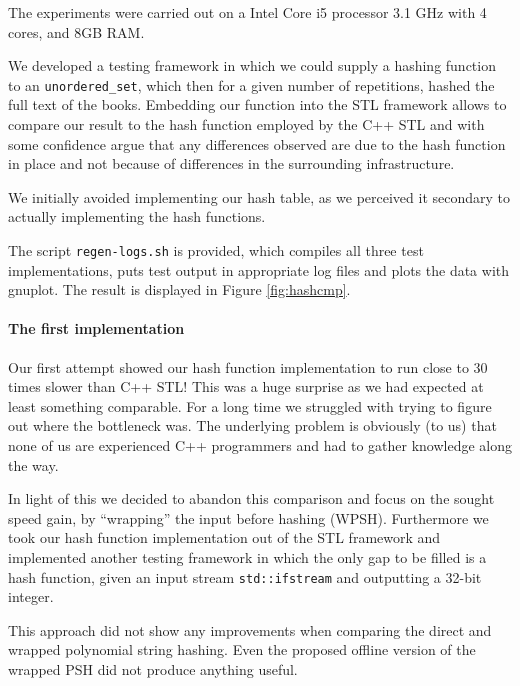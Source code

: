 \documentclass[]{article}
\newcommand{\funk}[1]{\texttt{\small #1}}
\newcommand{\cpp}{C+\!+\xspace}
\begin{document}
The experiments were carried out on a Intel Core i5 processor 3.1 GHz with 4 cores, and 8GB RAM.

We developed a testing framework in which we could supply a hashing function to an \funk{unordered\_set}, which then for a given number of repetitions, hashed the full text of the books. Embedding our function into the STL framework allows to compare our result to the hash function employed by the \cpp STL and with some confidence argue that any differences observed are due to the hash function in place and not because of differences in the surrounding infrastructure. 

We initially avoided implementing our hash table, as we perceived it secondary to actually implementing the hash functions.

The script \funk{regen-logs.sh} is provided, which compiles all three test implementations, puts test output in appropriate log files and plots the data with gnuplot. The result is displayed in Figure \ref{fig:hashcmp}.

\paragraph{The first implementation}

Our first attempt showed our hash function implementation to run close to 30 times slower than \cpp STL! This was a huge surprise as we had expected at least something comparable. For a long time we struggled with trying to figure out where the bottleneck was. The underlying problem is obviously (to us) that none of us are experienced \cpp programmers and had to gather knowledge along the way.

In light of this we decided to abandon this comparison and focus on the sought speed gain, by ``wrapping'' the input before hashing (WPSH). Furthermore we took our hash function implementation out of the STL framework and implemented another testing framework in which the only gap to be filled is a hash function, given an input stream \funk{std::ifstream} and outputting a 32-bit integer.

This approach did not show any improvements when comparing the direct and wrapped polynomial string hashing. Even the proposed offline version of the wrapped PSH did not produce anything useful.

\end{document}
